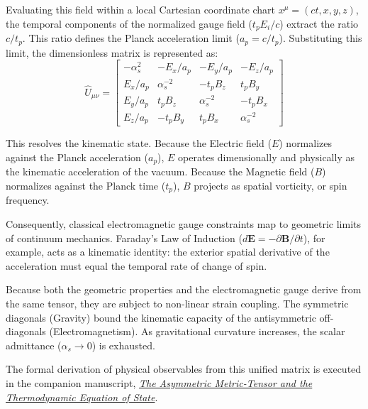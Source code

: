 Evaluating this field within a local Cartesian coordinate chart $x^\mu = (ct, x, y, z)$, the temporal components of the normalized gauge field ($t_p E_i / c$) extract the ratio $c/t_p$. This ratio defines the Planck acceleration limit ($a_p = c/t_p$). Substituting this limit, the dimensionless matrix is represented as: 
\begin{equation}
    \hat{U}_{\mu\nu} = \begin{bmatrix} -\alpha_s^2 & -E_x/a_p & -E_y/a_p & -E_z/a_p \\ E_x/a_p & \alpha_s^{-2} & -t_p B_z & t_p B_y \\ E_y/a_p & t_p B_z & \alpha_s^{-2} & -t_p B_x \\ E_z/a_p & -t_p B_y & t_p B_x & \alpha_s^{-2} \end{bmatrix}
\end{equation}

This resolves the kinematic state. Because the Electric field ($E$) normalizes against the Planck acceleration ($a_p$), $E$ operates dimensionally and physically as the kinematic acceleration of the vacuum. Because the Magnetic field ($B$) normalizes against the Planck time ($t_p$), $B$ projects as spatial vorticity, or spin frequency.

Consequently, classical electromagnetic gauge constraints map to geometric limits of continuum mechanics. Faraday's Law of Induction ($d\mathbf{E} = -\partial \mathbf{B} / \partial t$), for example, acts as a kinematic identity: the exterior spatial derivative of the acceleration must equal the temporal rate of change of spin. %

Because both the geometric properties and the electromagnetic gauge derive from the same tensor, they are subject to non-linear strain coupling. The symmetric diagonals (Gravity) bound the kinematic capacity of the antisymmetric off-diagonals (Electromagnetism). As gravitational curvature increases, the scalar admittance ($\alpha_s \to 0$) is exhausted. 

The formal derivation of physical observables from this unified matrix is executed in the companion manuscript, \href{https://doi.org/10.5281/zenodo.21321264}{\textit{The Asymmetric Metric-Tensor and the Thermodynamic Equation of State}}.


